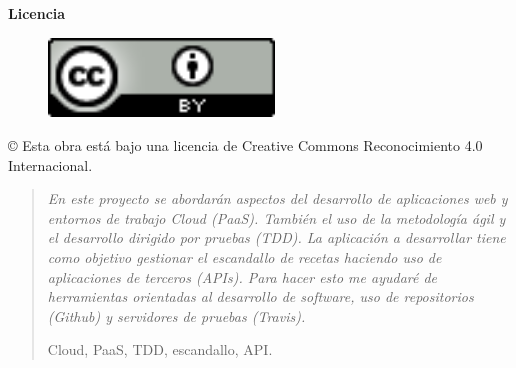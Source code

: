 \documentclass[spanish,a4paper,twoside]{report}
\newenvironment{palabrasClave}
{\begin{list}{}{\setlength{\leftmargin}{1em}}\item[\hskip\labelsep \bfseries Palabras clave:]}
{\end{list}}
\begin{document}
\cleardoublepage
{
\begin{center}
  \textbf{{\huge Licencia}}

  \vspace*{0.2in}
  \begin{figure}[htb]
    \begin{center}
      \includegraphics[width=6cm]{./images/logotipo-licencia.png}
    \end{center}
  \end{figure}
  
  \vspace*{0.2in}
  \begin{Large}
    © Esta obra está bajo una licencia de Creative Commons Reconocimiento 4.0 Internacional.
  \end{Large}
\end{center}
}


\cleardoublepage
\begin{abstract}
{\em 
En este proyecto se abordarán aspectos del desarrollo de aplicaciones web y entornos de trabajo Cloud (PaaS). También el uso de la metodología ágil y el desarrollo dirigido por pruebas (TDD). La aplicación a desarrollar tiene como objetivo gestionar el escandallo de recetas haciendo uso de aplicaciones de terceros (APIs). Para hacer esto me ayudaré de herramientas orientadas al desarrollo de software, uso de repositorios (Github) y servidores de pruebas (Travis).
}

\vspace*{0.2in}
\begin{palabrasClave}
  Cloud, PaaS, TDD, escandallo, API.
\end{palabrasClave}

\end{abstract}
\end{document}
